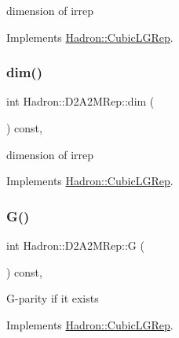 dimension of irrep 

Implements \mbox{\hyperlink{structHadron_1_1CubicLGRep_a3acbaea26503ed64f20df693a48e4cdd}{Hadron\+::\+Cubic\+L\+G\+Rep}}.

\mbox{\label{structHadron_1_1D2A2MRep_a8c1eee2c61a4d9f6721fe703253d5c26}} 
\subsubsection{\texorpdfstring{dim()}{dim()}\hspace{0.1cm}{\footnotesize\ttfamily [3/3]}}
{\footnotesize\ttfamily int Hadron\+::\+D2\+A2\+M\+Rep\+::dim (\begin{DoxyParamCaption}{ }\end{DoxyParamCaption}) const\hspace{0.3cm}{\ttfamily [inline]}, {\ttfamily [virtual]}}

dimension of irrep 

Implements \mbox{\hyperlink{structHadron_1_1CubicLGRep_a3acbaea26503ed64f20df693a48e4cdd}{Hadron\+::\+Cubic\+L\+G\+Rep}}.

\mbox{\label{structHadron_1_1D2A2MRep_a2596fa94fc03bbceebf051143cfb14ea}} 
\subsubsection{\texorpdfstring{G()}{G()}\hspace{0.1cm}{\footnotesize\ttfamily [1/3]}}
{\footnotesize\ttfamily int Hadron\+::\+D2\+A2\+M\+Rep\+::G (\begin{DoxyParamCaption}{ }\end{DoxyParamCaption}) const\hspace{0.3cm}{\ttfamily [inline]}, {\ttfamily [virtual]}}

G-\/parity if it exists 

Implements \mbox{\hyperlink{structHadron_1_1CubicLGRep_ace26f7b2d55e3a668a14cb9026da5231}{Hadron\+::\+Cubic\+L\+G\+Rep}}.

\mbox{\label{structHadron_1_1D2A2MRep_a2596fa94fc03bbceebf051143cfb14ea}} 

